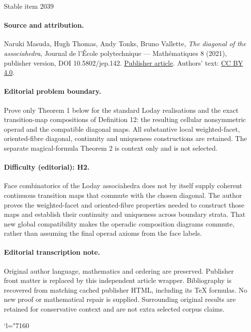 \documentclass[11pt]{article}
\numberwithin{equation}{section}\providecommand{\No}{}
\newcommand{\Changel}{\mathcode`l="7160}
\theoremstyle{plain}
\theoremstyle{definition}
\begin{document}
\begin{center}{\Large Stable item 2039}\end{center}
\paragraph{Source and attribution.}
Naruki Masuda, Hugh Thomas, Andy Tonks, Bruno Vallette, \emph{The diagonal of the associahedra}, Journal de l’École polytechnique — Mathématiques 8 (2021), publisher version, DOI 10.5802/jep.142. \href{https://jep.centre-mersenne.org/articles/10.5802/jep.142/}{Publisher article}. Authors' text: \href{https://creativecommons.org/licenses/by/4.0/}{CC BY 4.0}.
\paragraph{Editorial problem boundary.}
Prove only Theorem 1 below for the standard Loday realisations and the exact transition-map compositions of Definition 12: the resulting cellular nonsymmetric operad and the compatible diagonal maps. All substantive local weighted-facet, oriented-fibre diagonal, continuity and uniqueness constructions are retained. The separate magical-formula Theorem 2 is context only and is not selected.
\paragraph{Difficulty (editorial): H2.}
Face combinatorics of the Loday associahedra does not by itself supply coherent continuous transition maps that commute with the chosen diagonal. The author proves the weighted-facet and oriented-fibre properties needed to construct those maps and establish their continuity and uniqueness across boundary strata. That new global compatibility makes the operadic composition diagrams commute, rather than assuming the final operad axioms from the face labels.
\paragraph{Editorial transcription note.}
Original author language, mathematics and ordering are preserved. Publisher front matter is replaced by this independent article wrapper. Bibliography is recovered from matching cached publisher HTML, including its TeX formulas. No new proof or mathematical repair is supplied. Surrounding original results are retained for conservative context and are not extra selected corpus claims.
\clearpage

\Changel
\vspace*{-2\baselineskip}\vskip0pt\enlargethispage{.5\baselineskip}%
\end{document}
